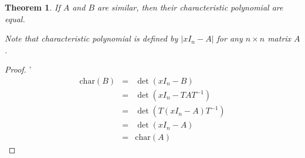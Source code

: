 \documentclass{article}
\theoremstyle{MyNonumberplain}
\theoremstyle{break}
\newtheorem*{proof}{Proof. }
\newcommand{\tmop}{\text}
\theoremstyle{break}
\newtheorem{theorem}{Theorem}[section]
\theoremstyle{break}
\theoremstyle{definition}
\theoremstyle{break}
\begin{document}
\begin{thmbox}
    \begin{theorem}
        If $A$ and $B$ are similar, then their characteristic polynomial are equal.\bigskip

        Note that characteristic polynomial is defined by $| x I_n - A |$ for any $n
        \times n$ matrix $A$.
    \end{theorem}
    \begin{prfbox}
        \begin{proof}'
            \begin{eqnarray*}
                \tmop{char} (B) & = & \det (x I_n - B)\\
                & = & \det (x I_n - T A T^{- 1})\\
                & = & \det (T (x I_n - A) T^{- 1})\\
                & = & \det (x I_n - A)\\
                & = & \tmop{char} (A)
              \end{eqnarray*}
        \end{proof}
    \end{prfbox}
\end{thmbox}
\end{document}
